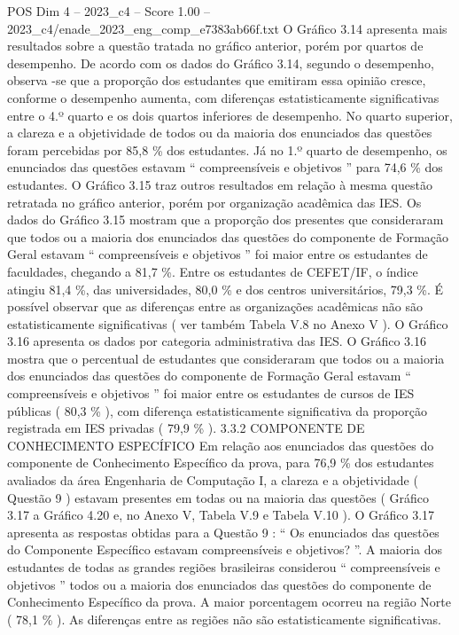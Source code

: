 \begin{textsample}{POS Dim 4 – 2023\_c4 – Score 1.00 – 2023\_c4/enade\_2023\_eng\_comp\_e7383ab66f.txt}
O Gráfico 3.14 apresenta mais resultados sobre a questão tratada no gráfico anterior, porém por quartos de desempenho.
De acordo com os dados do Gráfico 3.14, segundo o desempenho, observa -se que a proporção dos estudantes que emitiram essa opinião cresce, conforme o desempenho aumenta, com diferenças estatisticamente significativas entre o 4.º quarto e os dois quartos inferiores de desempenho.
No quarto superior, a clareza e a objetividade de todos ou da maioria dos enunciados das questões foram percebidas por 85,8 \% dos estudantes.
Já no 1.º quarto de desempenho, os enunciados das questões estavam “ compreensíveis e objetivos ” para 74,6 \% dos estudantes.
O Gráfico 3.15 traz outros resultados em relação à mesma questão retratada no gráfico anterior, porém por organização acadêmica das IES.
Os dados do Gráfico 3.15 mostram que a proporção dos presentes que consideraram que todos ou a maioria dos enunciados das questões do componente de Formação Geral estavam “ compreensíveis e objetivos ” foi maior entre os estudantes de faculdades, chegando a 81,7 \%.
Entre os estudantes de CEFET/IF, o índice atingiu 81,4 \%, das universidades, 80,0 \% e dos centros universitários, 79,3 \%.
É possível observar que as diferenças entre as organizações acadêmicas não são estatisticamente significativas ( ver também Tabela V.8 no Anexo V ).
O Gráfico 3.16 apresenta os dados por categoria administrativa das IES.
O Gráfico 3.16 mostra que o percentual de estudantes que consideraram que todos ou a maioria dos enunciados das questões do componente de Formação Geral estavam “ compreensíveis e objetivos ” foi maior entre os estudantes de cursos de IES públicas ( 80,3 \% ), com diferença estatisticamente significativa da proporção registrada em IES privadas ( 79,9 \% ). 3.3.2 COMPONENTE DE CONHECIMENTO ESPECÍFICO Em relação aos enunciados das questões do componente de Conhecimento Específico da prova, para 76,9 \% dos estudantes avaliados da área Engenharia de Computação I, a clareza e a objetividade ( Questão 9 ) estavam presentes em todas ou na maioria das questões ( Gráfico 3.17 a Gráfico 4.20 e, no Anexo V, Tabela V.9 e Tabela V.10 ).
O Gráfico 3.17 apresenta as respostas obtidas para a Questão 9 : “ Os enunciados das questões do Componente Específico estavam compreensíveis e objetivos? ”.
A maioria dos estudantes de todas as grandes regiões brasileiras considerou “ compreensíveis e objetivos ” todos ou a maioria dos enunciados das questões do componente de Conhecimento Específico da prova.
A maior porcentagem ocorreu na região Norte ( 78,1 \% ).
As diferenças entre as regiões não são estatisticamente significativas.

\end{textsample}
